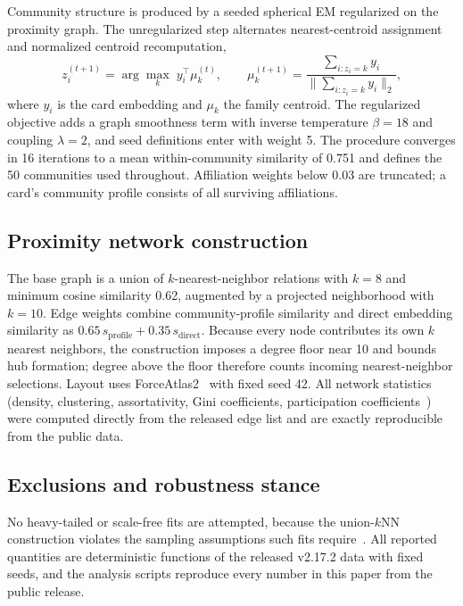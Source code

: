 \documentclass[11pt,a4paper]{article}
\begin{document}
Community structure is produced by a seeded spherical EM regularized on the proximity graph. The unregularized step alternates nearest-centroid assignment and normalized centroid recomputation,
\begin{equation}
z_i^{(t+1)}=\arg\max_k\; y_i^{\top}\mu_k^{(t)},\qquad
\mu_k^{(t+1)}=\frac{\sum_{i:z_i=k}y_i}{\lVert\sum_{i:z_i=k}y_i\rVert_2},
\end{equation}
where $y_i$ is the card embedding and $\mu_k$ the family centroid. The regularized objective adds a graph smoothness term with inverse temperature $\beta=18$ and coupling $\lambda=2$, and seed definitions enter with weight 5. The procedure converges in 16 iterations to a mean within-community similarity of 0.751 and defines the 50 communities used throughout. Affiliation weights below 0.03 are truncated; a card's community profile consists of all surviving affiliations.

\subsection*{Proximity network construction}

The base graph is a union of $k$-nearest-neighbor relations with $k=8$ and minimum cosine similarity 0.62, augmented by a projected neighborhood with $k=10$. Edge weights combine community-profile similarity and direct embedding similarity as $0.65\,s_{\mathrm{profile}}+0.35\,s_{\mathrm{direct}}$. Because every node contributes its own $k$ nearest neighbors, the construction imposes a degree floor near 10 and bounds hub formation; degree above the floor therefore counts incoming nearest-neighbor selections. Layout uses ForceAtlas2~\cite{jacomy2014} with fixed seed 42. All network statistics (density, clustering, assortativity, Gini coefficients, participation coefficients~\cite{guimera2005}) were computed directly from the released edge list and are exactly reproducible from the public data.

\subsection*{Exclusions and robustness stance}

No heavy-tailed or scale-free fits are attempted, because the union-$k$NN construction violates the sampling assumptions such fits require~\cite{clauset2009,broido2019}. All reported quantities are deterministic functions of the released v2.17.2 data with fixed seeds, and the analysis scripts reproduce every number in this paper from the public release.
\end{document}
